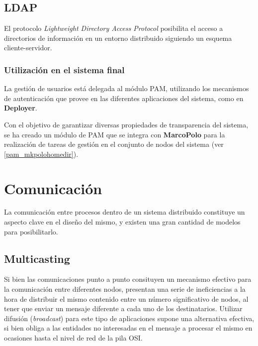 \subsection{LDAP}
\label{teoria:ldap}

El protocolo \textit{Lightweight Directory Access Protocol} posibilita el acceso a directorios de información en un entorno distribuido siguiendo un esquema cliente-servidor.


\subsubsection{Utilización en el sistema final}

La gestión de usuarios está delegada al módulo PAM, utilizando los mecanismos de autenticación que provee en las diferentes aplicaciones del sistema, como en \textbf{Deployer}.

Con el objetivo de garantizar diversas propiedades de transparencia del sistema, se ha creado un módulo de PAM que se integra con \textbf{MarcoPolo} para la realización de tareas de gestión en el conjunto de nodos del sistema (ver \ref{pam_mkpolohomedir}).

\section{Comunicación}

La comunicación entre procesos dentro de un sistema distribuido constituye un aspecto clave en el diseño del mismo, y existen una gran cantidad de modelos para posibilitarlo.

\subsection{Multicasting}

Si bien las comunicaciones punto a punto consituyen un mecanismo efectivo para la comunicación entre diferentes nodos, presentan una serie de ineficiencias a la hora de distribuir el mismo contenido entre un número significativo de nodos, al tener que enviar un mensaje diferente a cada uno de los destinatarios. Utilizar difusión (\textit{broadcast}) para este tipo de aplicaciones supone una alternativa efectiva, si bien obliga a las entidades no interesadas en el mensaje a procesar el mismo en ocasiones hasta el nivel de red de la pila OSI.

